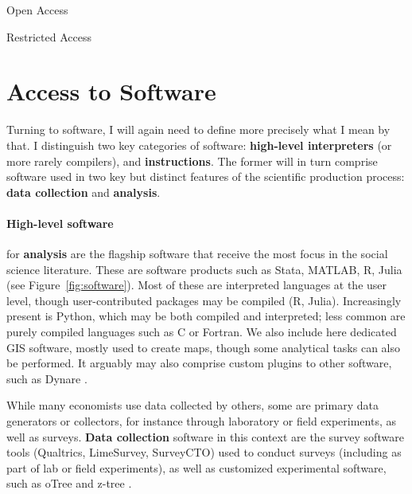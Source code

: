 \documentclass{article}
\begin{document}
Open Access

Restricted Access





\section{Access to Software}
\label{sec:software}

Turning to software, I will again need to define more precisely what I mean by that. I distinguish two key categories of software: \textbf{high-level interpreters} (or more rarely compilers), and \textbf{instructions}. The former will in turn comprise software used in two key but distinct features of the scientific production process: \textbf{data collection} and \textbf{analysis}. 

\paragraph{High-level software} for \textbf{analysis} are the flagship software  that receive the most  focus in the social science literature. These are software products such as Stata, MATLAB, R, Julia (see Figure~\ref{fig:software}). Most of these are interpreted languages at the user level, though user-contributed packages may be compiled (R, Julia). Increasingly present is Python, which may be both compiled and interpreted; less common are purely compiled languages such as C or Fortran. We also include here dedicated \ac{GIS} software, mostly used to create maps, though some analytical tasks can also be performed. It arguably may also comprise custom plugins to other software, such as Dynare \citep{adjemian_dynare_2024,cherrier_write_2023}.



While many economists use data collected by others, some are primary data generators or collectors, for instance through laboratory or field experiments, as well as surveys. \textbf{Data collection} software in this context are the survey software tools (Qualtrics, LimeSurvey, SurveyCTO) used to conduct surveys (including as part of lab or field experiments), as well as customized experimental software, such as oTree \citep{chen_otreeopen-source_2016} and z-tree \citep{fischbache_z-tree_2021}.
\end{document}
